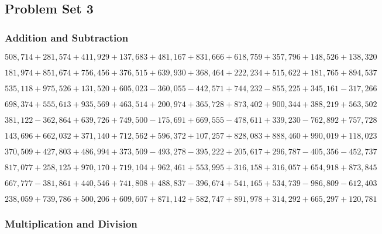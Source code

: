 \hypertarget{problem-set-3-5}{%
\subsection{Problem Set 3}\label{problem-set-3-5}}

\hypertarget{addition-and-subtraction-308}{%
\subsubsection{Addition and
Subtraction}\label{addition-and-subtraction-308}}

\(508,714+281,574+411,929+137,683+481,167+831,666+618,759+357,796+148,526+ 138,320\)

\(181,974+851,674+756,456+376,515+639,930+368,464+222,234+515,622+181,765+894,537\)

\(535,118+975,526+131,520+605,023-360,055-442,571+744,232-855,225+345,161-317,266\)

\(698,374+555,613+935,569+463,514+200,974+365,728+873,402+900,344+388,219+563,502\)

\(381,122-362,864+639,726+749,500-175,691+669,555-478,611+339,230-762,892+757,728\)

\(143,696+662,032+371,140+712,562+596,372+107,257+828,083+888,460+990,019+118,023\)

\(370,509+427,803+486,994+373,509-493,278-395,222+205,617+296,787-405,356-452,737\)

\(817,077+258,125+970,170+719,104+962,461+553,995+316,158+316,057+654,918+873,845\)

\(667,777-381,861+440,546+741,808+488,837-396,674+541,165+534,739-986,809-612,403\)

\(238,059+739,786+500,206+609,607+871,142+582,747+891,978+314,292+665,297+120,781\)

\hypertarget{multiplication-and-division-307}{%
\subsubsection{Multiplication and
Division}\label{multiplication-and-division-307}}

